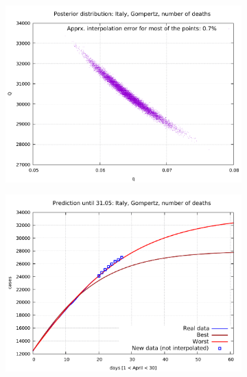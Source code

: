\documentclass[8pt]{article}
\begin{document}
\begin{figure}[h!]
  \centering
  \begin{subfigure}[b]{0.5\linewidth}
  \includegraphics[width=\linewidth]{../it_g_d/posterior.pdf}
  \end{subfigure}
  \begin{subfigure}[b]{0.48\linewidth}
    \includegraphics[width=\linewidth]{../it_g_d/prediction.pdf}
  \end{subfigure}
  \begin{subfigure}[b]{0.48\linewidth}

\end{subfigure}
\end{figure}
\end{document}
